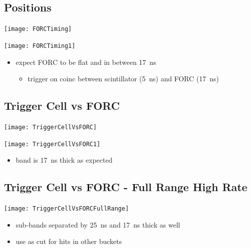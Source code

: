 \documentclass[9pt]{beamer}
\begin{document}
\subsection{Positions}
\begin{frame}
	\begin{center}
		\begin{minipage}{5.5cm}
			\centering
			\texttt{[image: FORCTiming]}
		\end{minipage}
		\hspace*{2pt}
		\begin{minipage}{5.5cm}
			\centering
			\texttt{[image: FORCTiming1]}
		\end{minipage}\no\s
	\end{center}
	\begin{itemize}
		\item expect FORC to be flat and in between \SI{17}{ns} 
		\begin{itemize}
			\item trigger on coinc between scintillator (\SI{5}{ns}) and FORC (\SI{17}{ns})
		\end{itemize}
	\end{itemize}
\end{frame}
\subsection{Trigger Cell vs FORC}
\begin{frame}
	\begin{center}
		\begin{minipage}{5.5cm}
			\centering
			\texttt{[image: TriggerCellVsFORC]}
		\end{minipage}
		\hspace*{2pt}
		\begin{minipage}{5.5cm}
			\centering
			\texttt{[image: TriggerCellVsFORC1]}
		\end{minipage}\no\s
	\begin{itemize}
		\item band is \SI{17}{ns} thick as expected
	\end{itemize}
	\end{center}
\end{frame}
\subsection{Trigger Cell vs FORC - Full Range High Rate}
\begin{frame}
	\begin{center}
		\texttt{[image: TriggerCellVsFORCFullRange]}
	\end{center}
	\begin{itemize}
		\item sub-bands separated by \SI{25}{ns} and \SI{17}{ns} thick as well
		\item use as cut for hits in other buckets
	\end{itemize}
\end{frame}
\end{document}
